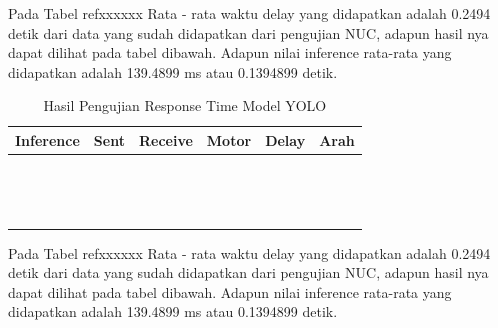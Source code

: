 Pada Tabel refxxxxxx Rata - rata waktu delay yang didapatkan adalah 0.2494 detik dari data yang sudah didapatkan dari pengujian NUC, adapun hasil nya dapat dilihat pada tabel dibawah. Adapun nilai inference rata-rata yang didapatkan adalah  139.4899 ms atau 0.1394899 detik.



\begin{table}[H]
  \centering
  \label{tb:TabelHasilPengujianResponseTimeYOLO}
  \caption{Hasil Pengujian Response Time Model YOLO}
  \begin{tabular}{|l|l|l|l|l|l|}
  \hline
  Inference & Sent & Receive & Motor & Delay & Arah \\ \hline
            &      &         &       &       &      \\ \hline
            &      &         &       &       &      \\ \hline
            &      &         &       &       &      \\ \hline
            &      &         &       &       &      \\ \hline
            &      &         &       &       &      \\ \hline
            &      &         &       &       &      \\ \hline
            &      &         &       &       &      \\ \hline
            &      &         &       &       &      \\ \hline
            &      &         &       &       &      \\ \hline
            &      &         &       &       &      \\ \hline
            &      &         &       &       &      \\ \hline
            &      &         &       &       &      \\ \hline
            &      &         &       &       &      \\ \hline
            &      &         &       &       &      \\ \hline
  \end{tabular}
  \end{table}

Pada Tabel refxxxxxx Rata - rata waktu delay yang didapatkan adalah 0.2494 detik dari data yang sudah didapatkan dari pengujian NUC, adapun hasil nya dapat dilihat pada tabel dibawah. Adapun nilai inference rata-rata yang didapatkan adalah  139.4899 ms atau 0.1394899 detik.


